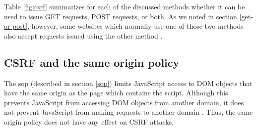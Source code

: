 Table \ref{fig:csrf} summarizes for each of the discussed methods whether it can be used to issue GET requests, POST requests, or both. As we noted in section \ref{get-or-post}, however, some websites which normally use one of those two methods also accept requests issued using the other method \cite{Zeller2008}.

\subsection{CSRF and the same origin policy}

The \gls{sop} (described in section \ref{sop}) limits JavaScript access to DOM objects that have the same origin as the page which contains the script. Although this prevents JavaScript from accessing DOM objects from another domain, it does not prevent JavaScript from making requests to another domain \cite{DeRyck2010}. Thus, the same origin policy does not have any effect on CSRF attacks.
